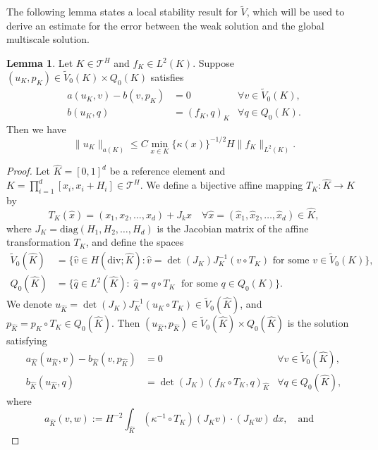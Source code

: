 \documentclass{article}[11pt]
\theoremstyle{definition}
\newtheorem{lemma}{Lemma}[section]
\begin{document}
The following lemma states a local stability result for $\tilde{V}$, 
which will be used to derive an estimate 
for the error between the weak solution 
and the global multiscale solution. 
\begin{lemma}\label{lemma:loc_stab}
Let $K \in \mathcal{T}^H$ and $f_K \in L^2(K)$.
Suppose $(u_K,p_K) \in \tilde{V}_{0}(K) \times Q_0(K)$ satisfies 
\begin{equation}
\begin{aligned}
a(u_K,v)-b(v,p_K) & = 0 & \forall v\in \tilde{V}_{0}(K),\\
b(u_K,q) & = (f_K, q)_K & \forall q\in Q_{0}(K).
\end{aligned}
\end{equation}
Then we have 
\[
\|u_K \|_{a(K)}\leq C\min_{x\in K}\{\kappa(x)\}^{-1/2}H\|f_K \|_{L^{2}(K)}.
\]
\begin{proof}
Let $\hat{K}=[0,1]^{d}$ be a reference element and $K=\prod_{i=1}^d [x_{i},x_{i}+H_i] \in \mathcal{T}^H$. 
We define a bijective affine mapping $T_K : \hat{K}\rightarrow K$ by 
\[ T_K(\hat{x}) = 
(x_1, x_2, \ldots, x_d) + J_k \hat{x} 
\quad \forall \hat{x} = (\hat{x}_1, \hat{x}_2, \ldots, \hat{x}_d) \in \hat{K}, \]
where $J_K = \text{diag}(H_1, H_2, \ldots, H_d)$ is the Jacobian matrix of the affine transformation $T_K$, and define the spaces 
\[
\begin{split}
\tilde{V}_0(\hat{K}) & = \{\hat{v}\in H(\text{div}; \hat{K}): \hat{v}= \det(J_K) J_K^{-1} (v\circ T_K) \text{ for some }v\in \tilde{V}_0(K)\}, \\ 
Q_0(\hat{K}) & = \{\hat{q}\in L^{2}(\hat{K}):\;\hat{q}=q\circ T_K \;\text{ for some }q\in Q_0(K)\}.
\end{split}
\]
We denote $u_{\hat{K}}= \det(J_K) J_K^{-1} (u_{K}\circ T_K) \in \tilde{V}_0(\hat{K})$, 
and $p_{\hat{K}} = p_K \circ T_K \in Q_0(\hat{K})$. Then
$(u_{\hat{K}},p_{\hat{K}}) \in \tilde{V}_{0}(\hat{K}) \times Q_0(\hat{K})$ is the solution satisfying
\begin{equation}
\begin{aligned}
a_{\hat{K}}(u_{\hat{K}},v)-b_{\hat{K}}(v,p_{\hat{K}}) & = 0 & \forall v\in \tilde{V}_{0}(\hat{K}),\\
b_{\hat{K}}(u_{\hat{K}},q) & = \det(J_K) (f_K \circ T_K, q)_{\hat{K}} & \forall q\in Q_0(\hat{K}),
\end{aligned}\label{eqn:local_u_0_re}
\end{equation}
where 
$$ a_{\hat{K}}(v,w) := H^{-2} \int_{\hat{K}} (\kappa^{-1} \circ T_K) (J_K v) \cdot (J_K w) ~ dx, \quad 
\text{and} \quad 
$$
\end{proof}
\end{lemma}
\end{document}
